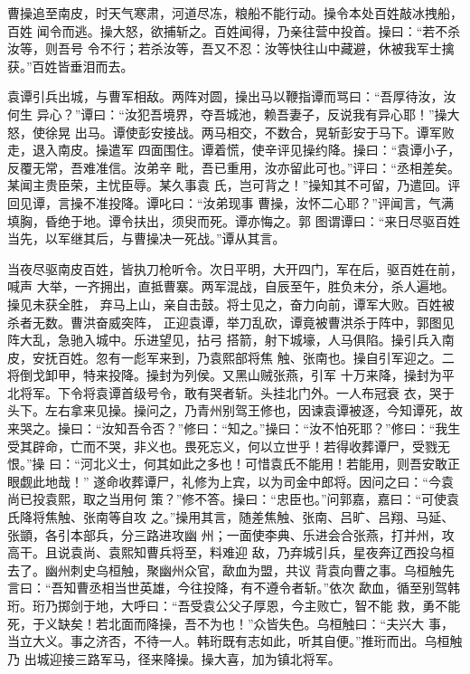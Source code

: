 曹操追至南皮，时天气寒肃，河道尽冻，粮船不能行动。操令本处百姓敲冰拽船，百姓
闻令而逃。操大怒，欲捕斩之。百姓闻得，乃亲往营中投首。操曰：“若不杀汝等，则吾号
令不行；若杀汝等，吾又不忍：汝等快往山中藏避，休被我军士擒获。”百姓皆垂泪而去。

袁谭引兵出城，与曹军相敌。两阵对圆，操出马以鞭指谭而骂曰：“吾厚待汝，汝何生
异心？”谭曰：“汝犯吾境界，夺吾城池，赖吾妻子，反说我有异心耶！”操大怒，使徐晃
出马。谭使彭安接战。两马相交，不数合，晃斩彭安于马下。谭军败走，退入南皮。操遣军
四面围住。谭着慌，使辛评见操约降。操曰：“袁谭小子，反覆无常，吾难准信。汝弟辛
毗，吾已重用，汝亦留此可也。”评曰：“丞相差矣。某闻主贵臣荣，主忧臣辱。某久事袁
氏，岂可背之！”操知其不可留，乃遣回。评回见谭，言操不准投降。谭叱曰：“汝弟现事
曹操，汝怀二心耶？”评闻言，气满填胸，昏绝于地。谭令扶出，须臾而死。谭亦悔之。郭
图谓谭曰：“来日尽驱百姓当先，以军继其后，与曹操决一死战。”谭从其言。

当夜尽驱南皮百姓，皆执刀枪听令。次日平明，大开四门，军在后，驱百姓在前，喊声
大举，一齐拥出，直抵曹寨。两军混战，自辰至午，胜负未分，杀人遍地。操见未获全胜，
弃马上山，亲自击鼓。将士见之，奋力向前，谭军大败。百姓被杀者无数。曹洪奋威突阵，
正迎袁谭，举刀乱砍，谭竟被曹洪杀于阵中，郭图见阵大乱，急驰入城中。乐进望见，拈弓
搭箭，射下城壕，人马俱陷。操引兵入南皮，安抚百姓。忽有一彪军来到，乃袁熙部将焦
触、张南也。操自引军迎之。二将倒戈卸甲，特来投降。操封为列侯。又黑山贼张燕，引军
十万来降，操封为平北将军。下令将袁谭首级号令，敢有哭者斩。头挂北门外。一人布冠衰
衣，哭于头下。左右拿来见操。操问之，乃青州别驾王修也，因谏袁谭被逐，今知谭死，故
来哭之。操曰：“汝知吾令否？”修曰：“知之。”操曰：“汝不怕死耶？”修曰：“我生
受其辟命，亡而不哭，非义也。畏死忘义，何以立世乎！若得收葬谭尸，受戮无恨。”操
曰：“河北义士，何其如此之多也！可惜袁氏不能用！若能用，则吾安敢正眼觑此地哉！”
遂命收葬谭尸，礼修为上宾，以为司金中郎将。因问之曰：“今袁尚已投袁熙，取之当用何
策？”修不答。操曰：“忠臣也。”问郭嘉，嘉曰：“可使袁氏降将焦触、张南等自攻
之。”操用其言，随差焦触、张南、吕旷、吕翔、马延、张顗，各引本部兵，分三路进攻幽
州；一面使李典、乐进会合张燕，打并州，攻高干。且说袁尚、袁熙知曹兵将至，料难迎
敌，乃弃城引兵，星夜奔辽西投乌桓去了。幽州刺史乌桓触，聚幽州众官，歃血为盟，共议
背袁向曹之事。乌桓触先言曰：“吾知曹丞相当世英雄，今往投降，有不遵令者斩。”依次
歃血，循至别驾韩珩。珩乃掷剑于地，大呼曰：“吾受袁公父子厚恩，今主败亡，智不能
救，勇不能死，于义缺矣！若北面而降操，吾不为也！”众皆失色。乌桓触曰：“夫兴大
事，当立大义。事之济否，不待一人。韩珩既有志如此，听其自便。”推珩而出。乌桓触乃
出城迎接三路军马，径来降操。操大喜，加为镇北将军。

